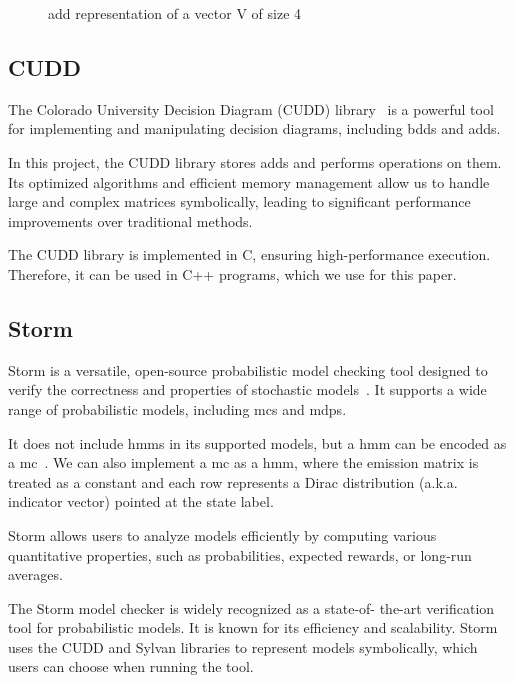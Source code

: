 \begin{figure}[htb!]
    \centering
    
    \caption{\gls{add} representation of a vector V of size 4}
    \label{fig:add_vector}
\end{figure}


\subsection{CUDD}\label{subsec:cudd}
The Colorado University Decision Diagram (CUDD) library~\cite{somenzi1997cudd} is a powerful tool for implementing and manipulating decision diagrams, including \glspl{bdd} and \glspl{add}.

In this project, the CUDD library stores \glspl{add} and performs operations on them.
Its optimized algorithms and efficient memory management allow us to handle large and complex matrices symbolically, leading to significant performance improvements over traditional methods.

The CUDD library is implemented in C, ensuring high-performance execution.
Therefore, it can be used in C++ programs, which we use for this paper.

\subsection{Storm}\label{subsec:storm}
Storm is a versatile, open-source probabilistic model checking tool designed to verify the correctness and properties of stochastic models~\cite{hensel2021probabilistic}.
It supports a wide range of probabilistic models, including \glspl{mc} and \glspl{mdp}.

It does not include \glspl{hmm} in its supported models, but a \gls{hmm} can be encoded as a \gls{mc}~\cite{rabiner1989tutorial}.
We can also implement a \gls{mc} as a \gls{hmm}, where the emission matrix is treated as a constant and each row represents a Dirac distribution (a.k.a. indicator vector) pointed at the state label.

Storm allows users to analyze models efficiently by computing various quantitative properties, such as probabilities, expected rewards, or long-run averages.

The Storm model checker is widely recognized as a state-of-
the-art verification tool for probabilistic models.
It is known for its efficiency and scalability.
Storm uses the CUDD and Sylvan libraries to represent models symbolically, which users can choose when running the tool.

